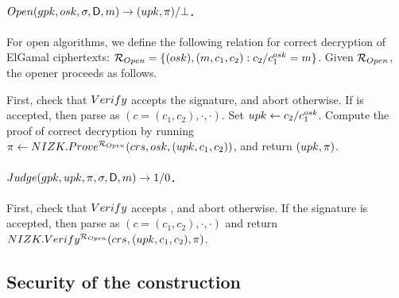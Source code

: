\paragraph{$Open(gpk,osk,\sigma,\mathsf{D},m)
  \rightarrow (upk,\pi)/\bot$.} %
For open algorithms, we define the following relation for correct decryption of
ElGamal ciphertexts: $\mathcal{R}_{Open} = \lbrace (osk),(m,c_1,c_2):
c_2/c_1^{osk} = m \rbrace$. Given $\mathcal{R}_{Open}$, the opener proceeds as
follows.

First, check that $Verify$ accepts the signature, and abort otherwise. If \sig
is accepted, then parse \sig as $(c=(c_1,c_2),\cdot,\cdot)$.
Set $upk \gets c_2/c_1^{osk}$. Compute the proof of correct decryption
by running $\pi \gets NIZK.Prove^{\mathcal{R}_{Open}}(crs,osk,
(upk,c_1,c_2))$, and return $(upk,\pi)$.

\paragraph{$Judge(gpk,upk,\pi,\sigma,\mathsf{D},m)
  \rightarrow 1/0$.} %
First, check that $Verify$ accepts \sig, and abort otherwise. If the signature
is accepted, then parse \sig as $(c=(c_1,c_2),\cdot,\cdot)$ and return
$NIZK.Verify^{\mathcal{R}_{Open}}(crs,(upk,c_1,c_2),\pi)$.


\subsection{Security of the \GSAC construction}



